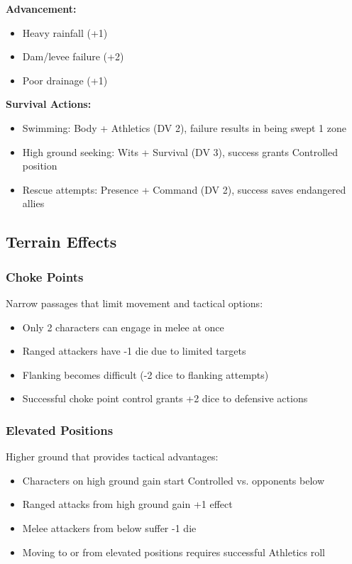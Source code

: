 \textbf{Advancement:}
\begin{itemize}[leftmargin=*]
    \item Heavy rainfall (+1)
    \item Dam/levee failure (+2)
    \item Poor drainage (+1)
\end{itemize}

\textbf{Survival Actions:}
\begin{itemize}[leftmargin=*]
    \item Swimming: Body + Athletics (DV 2), failure results in being swept 1 zone
    \item High ground seeking: Wits + Survival (DV 3), success grants Controlled position
    \item Rescue attempts: Presence + Command (DV 2), success saves endangered allies
\end{itemize}

\subsection{Terrain Effects}

\subsubsection{Choke Points}

Narrow passages that limit movement and tactical options:
\begin{itemize}[leftmargin=*]
    \item Only 2 characters can engage in melee at once
    \item Ranged attackers have -1 die due to limited targets
    \item Flanking becomes difficult (-2 dice to flanking attempts)
    \item Successful choke point control grants +2 dice to defensive actions
\end{itemize}

\subsubsection{Elevated Positions}

Higher ground that provides tactical advantages:
\begin{itemize}[leftmargin=*]
    \item Characters on high ground gain start Controlled vs. opponents below
    \item Ranged attacks from high ground gain +1 effect
    \item Melee attackers from below suffer -1 die
    \item Moving to or from elevated positions requires successful Athletics roll
\end{itemize}

